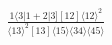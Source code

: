 \documentclass[varwidth, border=5pt]{standalone}
\begin{document}
\begin{my}
$\begin{gathered}
\scriptscriptstyle\frac{1⟨3|1+2|3][12]⟨12⟩^2}{⟨13⟩^2[13]⟨15⟩⟨34⟩⟨45⟩}
\end{gathered}$
\end{my}
\end{document}
